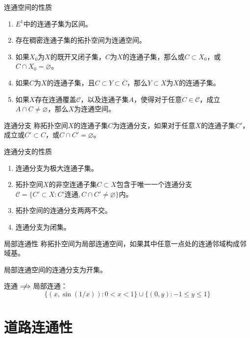 \documentclass[lang = cn, scheme = chinese, thmcnt = section, usesamecnt]{elegantbook}
\newcommand{\sub}{\subset}             %
\begin{document}
\begin{theorem}{连通空间的性质}
	\begin{enumerate}
		\item $E^1$中的连通子集为区间。
		\item 存在稠密连通子集的拓扑空间为连通空间。
		\item 如果$X_0$为$X$的既开又闭子集，$C$为$X$的连通子集，那么或$C\sub X_0$，或$C\cap X_0=\varnothing$。
		\item 如果$C$为$X$的连通子集，且$C\sub Y\sub \overline{C}$，那么$Y\sub X$为$X$的连通子集。
		\item 如果$X$存在连通覆盖$\mathscr{C}$，以及连通子集$A$，使得对于任意$C\in\mathscr{C}$，成立$A\cap C\ne\varnothing$，那么$X$为连通空间。
	\end{enumerate}
\end{theorem}

\begin{definition}{连通分支}
	称拓扑空间$X$的连通子集$C$为连通分支，如果对于任意$X$的连通子集$C'$，成立或$C'\sub C$，或$C\cap C'=\varnothing$。
\end{definition}

\begin{proposition}{连通分支的性质}
	\begin{enumerate}
		\item 连通分支为极大连通子集。
		\item 拓扑空间$X$的非空连通子集$C\sub X$包含于唯一一个连通分支$\mathscr{C}=\{ C'\sub X:C'\text{连通},C\cap C'\ne\varnothing \}$内。
		\item 拓扑空间的连通分支两两不交。
		\item 连通分支为闭集。
	\end{enumerate}
\end{proposition}

\begin{definition}{局部连通性}
	称拓扑空间为局部连通空间，如果其中任意一点处的连通邻域构成邻域基。
\end{definition}

\begin{remark}
	局部连通空间的连通分支为开集。
\end{remark}

\begin{remark}
	连通$\centernot\implies$局部连通：%
	$$
	\{ (x,\sin(1/x)):0<x <1 \}\cup\{ (0,y):-1\le y\le 1 \}
	$$
\end{remark}

\section{道路连通性}
\end{document}
